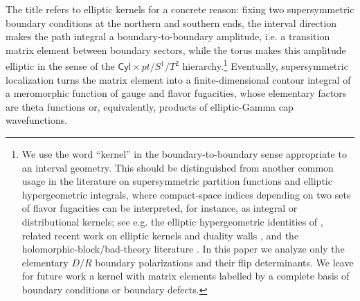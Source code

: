 \documentclass[11pt,a4paper]{article}
\numberwithin{equation}{section}
\theoremstyle{plain}
\theoremstyle{definition}
\theoremstyle{remark}
\newcommand{\cyl}{\mathsf{Cyl}}
\begin{document}
The title refers to elliptic kernels for a concrete reason: fixing two supersymmetric boundary conditions at the northern and southern ends, the interval direction makes the path integral a boundary-to-boundary amplitude, i.e. a transition matrix element between boundary sectors, while the torus makes this amplitude elliptic in the sense of the $\cyl\times pt/S^1/T^2$ hierarchy.\footnote{We use the word ``kernel'' in the boundary-to-boundary sense appropriate to an interval geometry. This should be distinguished from another common usage in the literature on supersymmetric partition functions and elliptic hypergeometric integrals, where compact-space indices depending on two sets of flavor fugacities can be interpreted, for instance, as integral or distributional kernels; see e.g. the elliptic hypergeometric identities of \cite{Spiridonov:2001ig,Rains:2003}, related recent work on elliptic kernels and duality walls \cite{Bottini:2021vms,Benvenuti:2024mpn}, and the holomorphic-block/bad-theory literature \cite{Pasquetti:2011fj,Beem:2012mb,Nieri:2015yia,Giacomelli:2023zkk,Giacomelli:2024laq}. In this paper we analyze only the elementary \(D/R\) boundary polarizations and their flip determinants. We leave for future work a  kernel with matrix elements labelled by a complete basis of boundary conditions or boundary defects.} Eventually, supersymmetric localization turns the matrix element into a finite-dimensional contour integral of a meromorphic function of gauge and flavor fugacities, whose elementary factors are theta functions or, equivalently, products of elliptic-Gamma cap wavefunctions.
\end{document}
